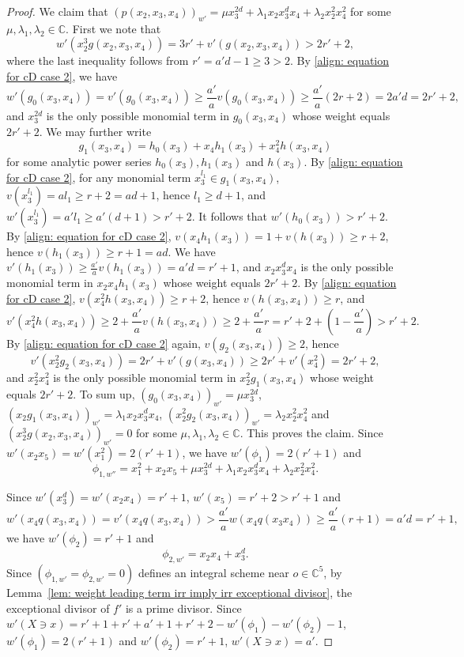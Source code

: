 \documentclass[11pt]{amsart}
\numberwithin{equation}{section}
\newcommand{\Cc}{\mathbb{C}}
\theoremstyle{definition}
\theoremstyle{definition}
\begin{document}
\begin{proof}
We claim that $(p(x_2,x_3,x_4))_{w'}=\mu x_3^{2d}+\lambda_1 x_2x_3^dx_4+\lambda_2 x_2^2x_4^2$ for some $\mu,\lambda_1,\lambda_2\in \Cc$. First we note that $$w'(x_2^3g(x_2,x_3,x_4))=3r'+v'(g(x_2,x_3,x_4))>2r'+2,$$ where the last inequality follows from $r'=a'd-1\geq 3>2$. By \eqref{align: equation for cD case 2}, we have $$w'(g_0(x_3,x_4))=v'(g_0(x_3,x_4))\geq \frac{a'}{a}v(g_0(x_3,x_4))\geq \frac{a'}{a}(2r+2)=2a'd=2r'+2,$$ and $x_3^{2d}$ is the only possible monomial term in $g_0(x_3,x_4)$ whose weight equals $2r'+2$. We may further write $$g_1(x_3,x_4)=h_0(x_3)+x_4h_1(x_3)+x_4^2h(x_3,x_4)$$ for some analytic power series $h_0(x_3),h_1(x_3)$ and $h(x_3)$. By \eqref{align: equation for cD case 2}, for any monomial term $x_3^{l_1}\in g_1(x_3,x_4)$, $v(x_3^{l_1})=al_1\geq r+2=ad+1$, hence $l_1\geq d+1$, and $w'(x_3^{l_1})=a'l_1\geq a'(d+1)>r'+2$. It follows that $w'(h_0(x_3))>r'+2$. By \eqref{align: equation for cD case 2}, $v(x_4h_1(x_3))=1+v(h(x_3))\geq r+2$, hence $v(h_1(x_3))\geq r+1=ad$. We have $v'(h_1(x_3))\geq \frac{a'}{a}v(h_1(x_3))=a'd=r'+1$, and $x_2x_3^{d}x_4$ is the only possible monomial term in $x_2x_4h_1(x_3)$ whose weight equals $2r'+2$. By \eqref{align: equation for cD case 2}, $v(x_4^2h(x_3,x_4))\geq r+2$, hence $v(h(x_3,x_4))\geq r$, and $$v'(x_4^2h(x_3,x_4))\geq 2+\frac{a'}{a}v(h(x_3,x_4))\geq 2+\frac{a'}{a}r=r'+2+(1-\frac{a'}{a})>r'+2.$$ By \eqref{align: equation for cD case 2} again, $v(g_2(x_3,x_4))\geq 2$, hence $$v'(x_2^2g_2(x_3,x_4))=2r'+v'(g(x_3,x_4))\geq 2r'+v'(x_4^2)=2r'+2,$$ and $x_2^2x_4^2$ is the only possible monomial term in $x_2^2g_1(x_3,x_4)$ whose weight equals $2r'+2$. To sum up, $(g_0(x_3,x_4))_{w'}=\mu x_3^{2d}$, $(x_2g_1(x_3,x_4))_{w'}=\lambda_1 x_2x_3^dx_4$, $(x_2^2g_2(x_3,x_4))_{w'}=\lambda_2x_2^2x_4^2$ and $(x_2^3g(x_2,x_3,x_4))_{w'}=0$ for some $\mu,\lambda_1,\lambda_2\in \Cc$. This proves the claim. Since $w'(x_2x_5)=w'(x_1^2)=2(r'+1)$, we have $w'(\phi_1)=2(r'+1)$ and $$\phi_{1,w''}=x_1^2+x_2x_5+\mu x_3^{2d}+\lambda_1 x_2x_3^dx_4+\lambda_2 x_2^2x_4^2.$$

Since $w'(x_3^d)=w'(x_2x_4)=r'+1$, $w'(x_5)=r'+2>r'+1$ and $$w'(x_4q(x_3,x_4))=v'(x_4q(x_3,x_4))>\frac{a'}{a}w(x_4q(x_3x_4))\geq \frac{a'}{a}(r+1)=a'd=r'+1,$$ we have $w'(\phi_2)=r'+1$ and $$\phi_{2,w'}=x_2x_4+x_3^d.$$ Since $(\phi_{1,w'}=\phi_{2,w'}=0)$ defines an integral scheme near $o\in \Cc^5$, by Lemma~\ref{lem: weight leading term irr imply irr exceptional divisor}, the exceptional divisor of $f'$ is a prime divisor. Since $w'(X\ni x)=r'+1+r'+a'+1+r'+2-w'(\phi_1)-w'(\phi_2)-1$, $w'(\phi_1)=2(r'+1)$ and $w'(\phi_2)=r'+1$, $w'(X\ni x)=a'$.


\end{proof}
\end{document}
